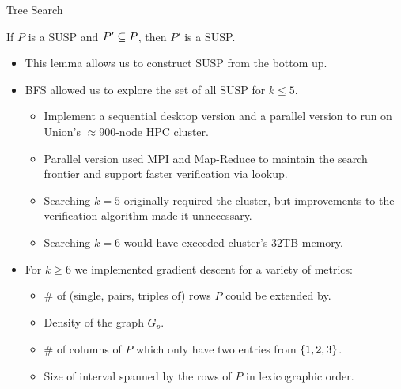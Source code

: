 \documentclass[t,10pt,
mathserif,xcolor=dvipsnames]{beamer}
\begin{document}
\begin{myframe}{Tree Search}

  \begin{lemma}
    If $P$ is a SUSP and $P' \subseteq P$, then $P'$ is a SUSP.
  \end{lemma}

  \begin{itemize}
  \item This lemma allows us to construct SUSP from the bottom up.


    \medskip
  \item BFS allowed us to explore the set of all SUSP for $k
    \le 5$.
    \begin{itemize}
    \item Implement a sequential desktop version and a parallel
      version to run on Union's $\approx$900-node HPC cluster.
    \item Parallel version used MPI and Map-Reduce to maintain the
      search frontier and support faster verification via lookup.
    \item Searching $k = 5$ originally required the cluster, but
      improvements to the verification algorithm made it
      unnecessary.
    \item Searching $k = 6$ would have exceeded cluster's $32$TB memory.
    \end{itemize}

    \medskip
  \item For $k \ge 6$ we implemented gradient descent for a variety of
    metrics:
    \begin{itemize}
    \item \# of (single, pairs, triples of) rows $P$ could be extended by.
    \item Density of the graph $G_p$.
    \item \# of columns of $P$ which only have two entries from
      $\{{1,2,3}\}$.
    \item Size of interval spanned by the rows of $P$ in lexicographic
      order.
    \end{itemize}
  \end{itemize}
  
\end{myframe}

\subsection{}
\end{document}

